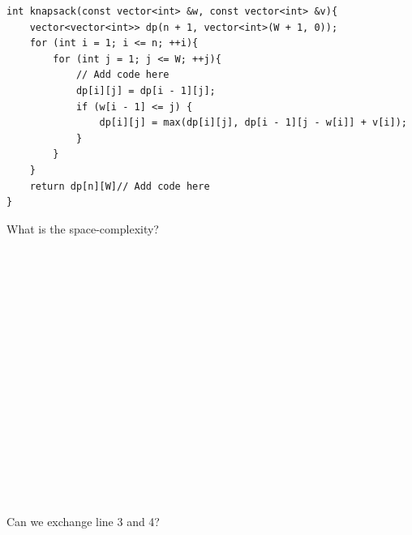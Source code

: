 \documentclass[11pt]{exam}
\begin{document}
\begin{lstlisting}
int knapsack(const vector<int> &w, const vector<int> &v){
    vector<vector<int>> dp(n + 1, vector<int>(W + 1, 0));
    for (int i = 1; i <= n; ++i){
        for (int j = 1; j <= W; ++j){
            // Add code here
            dp[i][j] = dp[i - 1][j];
            if (w[i - 1] <= j) {
                dp[i][j] = max(dp[i][j], dp[i - 1][j - w[i]] + v[i]);
            }
        }
    }
    return dp[n][W]// Add code here
}
\end{lstlisting}
What is the space-complexity?
\begin{solution}
    \\ \hspace*{\fill} \\
    \\ \hspace*{\fill} \\
    \\ \hspace*{\fill} \\
    \\ \hspace*{\fill} \\
    \\ \hspace*{\fill} \\
    \\ \hspace*{\fill} \\
    \\ \hspace*{\fill} \\
    \\ \hspace*{\fill} \\

\end{solution}
Can we exchange line 3 and 4?
\begin{solution}
    \\ \hspace*{\fill} \\
    \\ \hspace*{\fill} \\
    \\ \hspace*{\fill} \\
    \\ \hspace*{\fill} \\
    \\ \hspace*{\fill} \\
    \\ \hspace*{\fill} \\
    \\ \hspace*{\fill} \\
    \\ \hspace*{\fill} \\

\end{solution}
\end{document}
